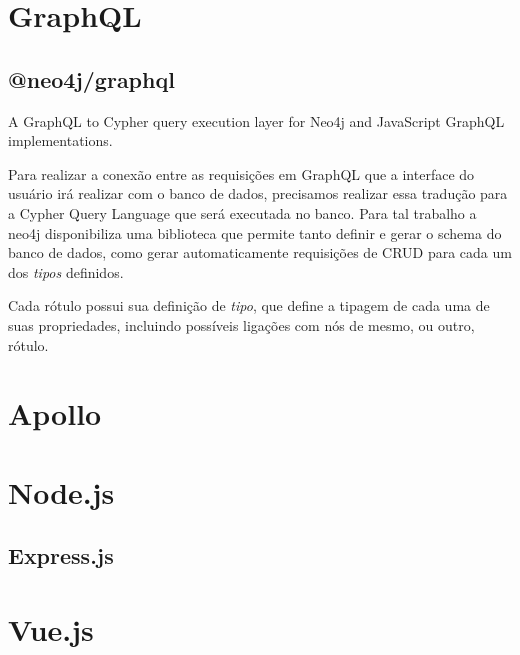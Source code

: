 \section{GraphQL}


\subsection{@neo4j/graphql}
A GraphQL to Cypher query execution layer for Neo4j and JavaScript GraphQL implementations.

Para realizar a conexão entre as requisições em GraphQL que a interface do usuário irá realizar com o banco de dados, precisamos realizar essa tradução para a Cypher Query Language que será executada no banco. Para tal trabalho a neo4j disponibiliza uma biblioteca que permite tanto definir e gerar o schema do banco de dados, como gerar automaticamente requisições de CRUD para cada um dos \textit{tipos} definidos.

Cada rótulo possui sua definição de \textit{tipo}, que define a tipagem de cada uma de suas propriedades, incluindo possíveis ligações com nós de mesmo, ou outro, rótulo.

\section{Apollo}

\section{Node.js}

\subsection{Express.js}

\section{Vue.js}

